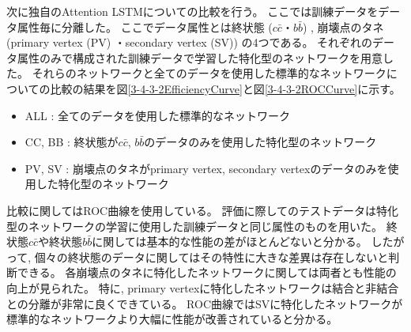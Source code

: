 次に独自のAttention LSTMについての比較を行う。
ここでは訓練データをデータ属性毎に分離した。
ここでデータ属性とは終状態 ($c\bar{c}$・$b\bar{b}$) , 崩壊点のタネ (primary vertex (PV) ・secondary vertex (SV)) の4つである。
それぞれのデータ属性のみで構成された訓練データで学習した特化型のネットワークを用意した。
それらのネットワークと全てのデータを使用した標準的なネットワークについての比較の結果を図\ref{3-4-3-2EfficiencyCurve}と図\ref{3-4-3-2ROCCurve}に示す。

\begin{itemize}
 \item ALL : 全てのデータを使用した標準的なネットワーク
 \item CC, BB : 終状態が$c\bar{c}$, $b\bar{b}$のデータのみを使用した特化型のネットワーク
 \item PV, SV : 崩壊点のタネがprimary vertex, secondary vertexのデータのみを使用した特化型のネットワーク
\end{itemize}

比較に関してはROC曲線を使用している。
評価に際してのテストデータは特化型のネットワークの学習に使用した訓練データと同じ属性のものを用いた。
終状態$c\bar{c}$や終状態$b\bar{b}$に関しては基本的な性能の差がほとんどないと分かる。
したがって, 個々の終状態のデータに関してはその特性に大きな差異は存在しないと判断できる。
各崩壊点のタネに特化したネットワークに関しては両者とも性能の向上が見られた。
特に, primary vertexに特化したネットワークは結合と非結合との分離が非常に良くできている。
ROC曲線ではSVに特化したネットワークが標準的なネットワークより大幅に性能が改善されていると分かる。

